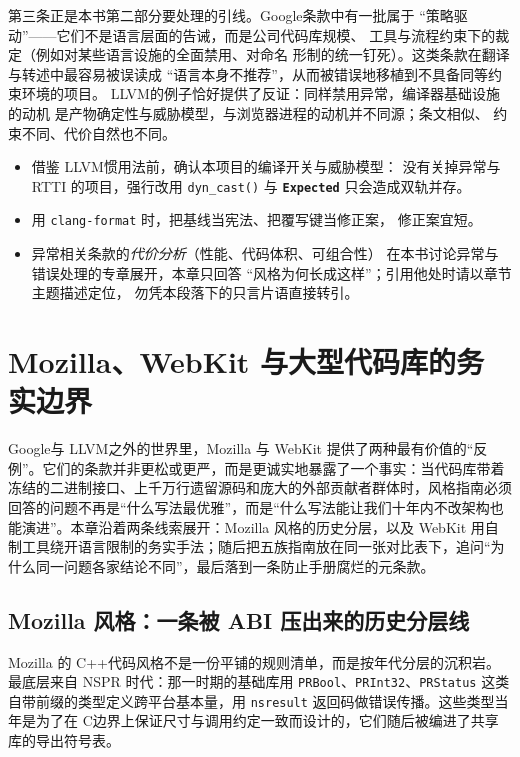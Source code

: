 \documentclass[12pt,a4paper,fontset=fandol]{ctexbook}
\newcommand{\Fn}[1]{\texttt{#1()}}
\newcommand{\Tp}[1]{\texttt{#1}}
\newcommand{\Bk}{\discretionary{}{}{}}
\newcommand{\Lib}[1]{\textbf{\texttt{#1}}}
\newcommand{\Lang}[1]{\textsf{#1}}
\newcommand{\CL}{\Lang{C}}
\newcommand{\CPP}{\Lang{C++}}
\newcommand{\DomGo}{\Lang{Google}}
\newcommand{\DomLlvm}{\Lang{LLVM}}
\begin{document}
第三条正是本书第二部分要处理的引线。\DomGo 条款中有一批属于
``策略驱动''——它们不是语言层面的告诫，而是公司代码库规模、
工具与流程约束下的裁定（例如对某些语言设施的全面禁用、对命名
形制的统一钉死）。这类条款在翻译与转述中最容易被误读成
``语言本身不推荐''，从而被错误地移植到不具备同等约束环境的项目。
\DomLlvm 的例子恰好提供了反证：同样禁用异常，编译器基础设施的动机
是产物确定性与威胁模型，与浏览器进程的动机并不同源；条文相似、
约束不同、代价自然也不同。

\begin{guideline}[title={本章收束：约束与借鉴的检查单}]
\begin{itemize}
  \item 借鉴 \DomLlvm 惯用法前，确认本项目的编译开关与威胁模型：
        没有关掉异常与 RTTI 的项目，强行改用 \Fn{dyn\_{\Bk}cast}
        与 \Lib{Expected} 只会造成双轨并存。
  \item 用 \Tp{clang-format} 时，把基线当宪法、把覆写键当修正案，
        修正案宜短。
  \item 异常相关条款的\emph{代价分析}（性能、代码体积、可组合性）
        在本书讨论异常与错误处理的专章展开，本章只回答
        ``风格为何长成这样''；引用他处时请以章节主题描述定位，
        勿凭本段落下的只言片语直接转引。
\end{itemize}
\end{guideline}


\chapter{Mozilla、WebKit 与大型代码库的务实边界}
\label{ch:ch04-mozilla}

\DomGo 与 \DomLlvm 之外的世界里，Mozilla 与 WebKit 提供了两种最有价值的``反例''。它们的条款并非更松或更严，而是更诚实地暴露了一个事实：当代码库带着冻结的二进制接口、上千万行遗留源码和庞大的外部贡献者群体时，风格指南必须回答的问题不再是``什么写法最优雅''，而是``什么写法能让我们十年内不改架构也能演进''。本章沿着两条线索展开：Mozilla 风格的历史分层，以及 WebKit 用自制工具绕开语言限制的务实手法；随后把五族指南放在同一张对比表下，追问``为什么同一问题各家结论不同''，最后落到一条防止手册腐烂的元条款。

\section{Mozilla 风格：一条被 ABI 压出来的历史分层线}
\label{sec:ch04-mozilla-history}

Mozilla 的 \CPP 代码风格不是一份平铺的规则清单，而是按年代分层的沉积岩。最底层来自 NSPR 时代：那一时期的基础库用 \Tp{PRBool}、\Tp{PRInt32}、\Tp{PRStatus} 这类自带前缀的类型定义跨平台基本量，用 \Tp{nsresult} 返回码做错误传播。这些类型当年是为了在 \CL 边界上保证尺寸与调用约定一致而设计的，它们随后被编进了共享库的导出符号表。
\end{document}
